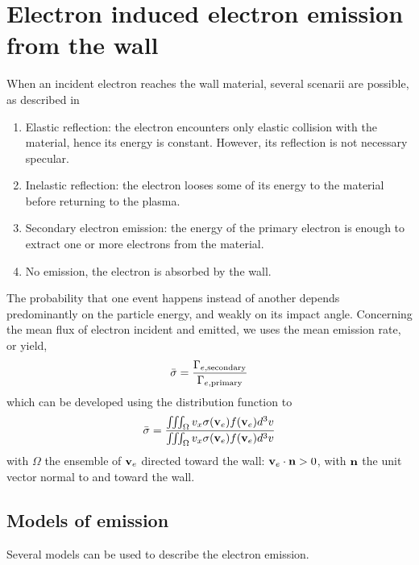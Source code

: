 
\section{Electron induced electron emission from the wall}
\label{sec-seemodel}
When an incident electron reaches the wall material, several scenarii are possible, as described in \citet{villemant2018}
\begin{enumerate}
  \item Elastic reflection\string: the electron encounters only elastic collision with the material, hence its energy is constant. However, its reflection is not necessary specular.
  \item Inelastic reflection\string: the electron looses some of its energy to the material before returning to the plasma.
  \item Secondary electron emission\string: the energy of the primary electron is enough to extract one or more electrons from the material.
  \item No emission, the electron is absorbed by the wall.
\end{enumerate}

The probability \proba{}  that one event happens instead of another depends predominantly on the particle energy, and weakly on its  impact angle.
Concerning the mean flux of electron incident and emitted, we uses the mean emission rate, or yield, \rate
\begin{equation*} \label{eq-ratedifinition}
   \bar{\sigma } = \frac{\Gamma_{e, \rm secondary}}{\Gamma_{e, \rm primary}}
\end{equation*}
which can be developed using the distribution function to 
\begin{equation*} \label{eq-ratedifinition_evdf}
   \bar{\sigma } = \frac{\iiint_{\Omega} v_x \sigma ({\mathbf v_e}) f({\mathbf v_e}) d^3v}{\iiint_{\Omega} v_x \sigma ({\mathbf v_e}) f({\mathbf v_e}) d^3v}
\end{equation*}
with $\Omega$ the ensemble of ${\mathbf v_e}$ directed toward the wall\string: ${\mathbf v_e} \cdot {\mathbf n} > 0$, with ${\mathbf n} $ the unit vector normal to and toward the wall.

\subsection{Models of emission } \label{subsec-seemodels}
Several models can be used to describe the electron emission.


